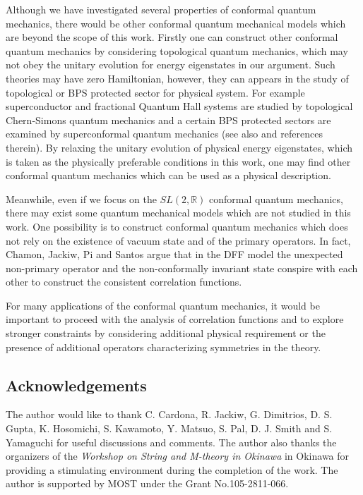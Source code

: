 \documentclass[12pt]{article}
\numberwithin{equation}{section}
\begin{document}
Although we have investigated several properties of conformal quantum mechanics, 
there would be other conformal quantum mechanical models which are beyond the scope of this work.  
Firstly one can construct other conformal quantum mechanics by considering topological quantum mechanics, 
which may not obey the unitary evolution for energy eigenstates in our argument. 
Such theories may have zero Hamiltonian, however, they can appears 
in the study of topological or BPS protected sector for physical system. 
For example superconductor and fractional Quantum Hall systems are studied by 
topological Chern-Simons quantum mechanics \cite{Manton:1997tg, Polychronakos:2001mi, Dorey:2016mxm} 
and a certain BPS protected sectors are examined by superconformal quantum mechanics \cite{Fubini:1984hf} 
(see also \cite{BrittoPacumio:1999ax, Fedoruk:2011aa, Okazaki:2015pfa} and references therein). 
By relaxing the unitary evolution of physical energy eigenstates, 
which is taken as the physically preferable conditions in this work, one may find other conformal quantum mechanics which can be used as a physical description. 

Meanwhile, even if we focus on the $SL(2,\mathbb{R})$ conformal quantum mechanics, there may exist some  quantum mechanical models which are not studied in this work. 
One possibility is to construct conformal quantum mechanics which does not rely on the existence of vacuum state and of the primary operators. 
In fact, Chamon, Jackiw, Pi and Santos \cite{Chamon:2011xk, Jackiw:2012ur} argue that 
in the DFF model the unexpected non-primary operator and the non-conformally invariant state conspire with each other 
to construct the consistent correlation functions.  

For many applications of the conformal quantum mechanics, it would be important to proceed with the analysis of correlation functions 
and to explore stronger constraints by considering additional physical requirement 
or the presence of additional operators 
characterizing symmetries in the theory. 





\subsection*{Acknowledgements}
The author would like to thank 
C. Cardona, R. Jackiw, G. Dimitrios, D. S. Gupta, 
K. Hosomichi, S. Kawamoto, Y. Matsuo, S. Pal, D. J. Smith 
and S. Yamaguchi for useful discussions and comments. 
The author also thanks the organizers of the 
\textit{Workshop on String and M-theory in Okinawa} 
in Okinawa for providing a stimulating environment 
during the completion of the work. 
The author is supported by MOST under the Grant No.105-2811-066. 






















\end{document}
